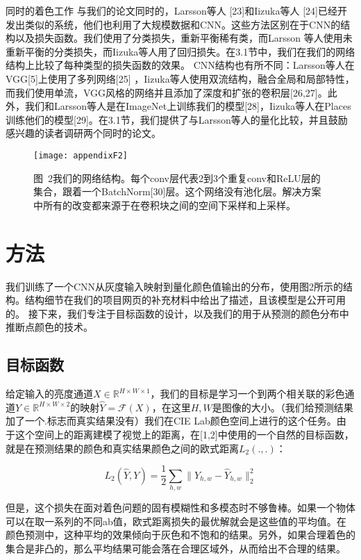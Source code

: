 $\textbf{同时的着色工作}$ 与我们的论文同时的，Larsson等人 [23]和Iizuka等人 [24]已经开发出类似的系统，他们也利用了大规模数据和CNN。这些方法区别在于CNN的结构以及损失函数。我们使用了分类损失，重新平衡稀有类，而Larsson 等人使用未重新平衡的分类损失，而Iizuka等人用了回归损失。在3.1节中，我们在我们的网络结构上比较了每种类型的损失函数的效果。 CNN结构也有所不同：Larsson等人在VGG[5]上使用了多列网络[25] ，Iizuka等人使用双流结构，融合全局和局部特性，而我们使用单流，VGG风格的网络并且添加了深度和扩张的卷积层[26,27]。此外，我们和Larsson等人是在ImageNet上训练我们的模型[28]，Iizuka等人在Places训练他们的模型[29]。在3.1节，我们提供了与Larsson等人的量化比较，并且鼓励感兴趣的读者调研两个同时的论文。

\begin{figure}[h]
  \centering
  \texttt{[image: appendixF2]}
  \caption*{图~2\quad 我们的网络结构。每个conv层代表2到3个重复conv和ReLU层的集合，跟着一个BatchNorm[30]层。这个网络没有池化层。解决方案中所有的改变都来源于在卷积块之间的空间下采样和上采样。}
  \label{tab:badfigure2}
\end{figure}

\section{方法}
我们训练了一个CNN从灰度输入映射到量化颜色值输出的分布，使用图2所示的结构。结构细节在我们的项目网页的补充材料中给出了描述，且该模型是公开可用的。 接下来，我们专注于目标函数的设计，以及我们的用于从预测的颜色分布中推断点颜色的技术。

\subsection{目标函数}
给定输入的亮度通道$X \in \mathbb{R}^{H \times W \times 1}$，我们的目标是学习一个到两个相关联的彩色通道$Y \in \mathbb{R}^{H \times W \times 2}$的映射$\hat{Y} = \mathcal{F}(X)$，在这里$H, W$是图像的大小。（我们给预测结果加了一个$\hat{.}$标志而真实结果没有）我们在CIE Lab颜色空间上进行的这个任务。由于这个空间上的距离建模了视觉上的距离，在[1,2]中使用的一个自然的目标函数，就是在预测结果的颜色和真实结果颜色之间的欧式距离$L_2(.,.)$：

\begin{equation}\tag*{(1)}
L_2(\hat{Y}, Y) = \frac{1}{2}\sum_{h,w}\|Y_{h,w} - \hat{Y}_{h,w}\|_{2}^{2}
\end{equation}

但是，这个损失在面对着色问题的固有模糊性和多模态时不够鲁棒。如果一个物体可以在取一系列的不同ab值，欧式距离损失的最优解就会是这些值的平均值。在颜色预测中，这种平均的效果倾向于灰色和不饱和的结果。另外，如果合理着色的集合是非凸的，那么平均结果可能会落在合理区域外，从而给出不合理的结果。

